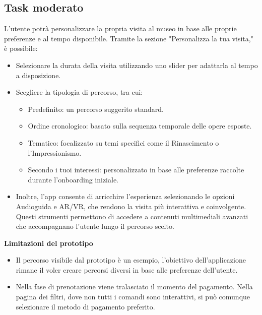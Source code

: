 \documentclass{article}
\begin{document}
\subsection{Task moderato}
L'utente potrà personalizzare la propria visita al museo in base alle proprie preferenze e al tempo disponibile. Tramite la sezione  "Personalizza la tua visita," è possibile:
\begin{itemize}
\item Selezionare la durata della visita utilizzando uno slider per adattarla al tempo a disposizione.
\item Scegliere la tipologia di percorso, tra cui: 
\begin{itemize}
\item Predefinito: un percorso suggerito standard.
\item Ordine cronologico: basato sulla sequenza temporale delle opere esposte.
\item Tematico: focalizzato su temi specifici come il Rinascimento o l’Impressionismo.
\item Secondo i tuoi interessi: personalizzato in base alle preferenze raccolte durante l’onboarding iniziale.
\end{itemize}
\item Inoltre, l’app consente di arricchire l’esperienza selezionando le opzioni Audioguida e AR/VR, che rendono la visita più interattiva e coinvolgente. Questi strumenti permettono di accedere a contenuti multimediali avanzati che accompagnano l’utente lungo il percorso scelto.
\end{itemize}
\textbf{Limitazioni del prototipo}
\begin{itemize}
\item Il percorso visibile dal prototipo è un esempio, l’obiettivo dell’applicazione rimane il voler creare percorsi diversi in base alle preferenze dell’utente.
\item Nella fase di prenotazione viene tralasciato il momento del pagamento. Nella pagina dei filtri, dove non tutti i comandi sono interattivi, si può comunque selezionare il metodo di pagamento preferito.
\end{itemize}
\end{document}
